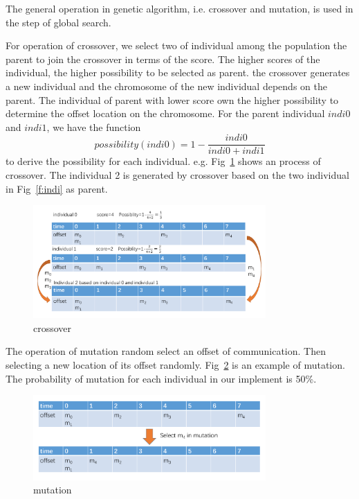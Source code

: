 \documentclass[conference]{IEEEtran}
\begin{document}
The general operation in genetic algorithm, i.e. crossover and mutation, is used in the step of global search. 

For operation of crossover, we select two of individual among the population the parent to join the crossover in terms of the score. The higher scores of the individual, the higher possibility to be selected as parent. the crossover generates a new individual and the chromosome of the new individual depends on the parent. The individual of parent with lower score own the higher possibility to determine the offset location on the chromosome. For the parent individual $indi0$ and $indi1$, we have the function
\begin{equation}
	possibility(indi0)=1-\frac{indi0}{indi0+indi1}
\end{equation}
to derive the possibility for each individual. e.g. Fig~\ref{f:crossover} shows an process of crossover. The individual 2 is generated by crossover based on the two individual in Fig~\ref{f:indi} as parent.
\begin{figure}[!t]
	\centering
	\includegraphics[width=3.5in]{picture/crossover.pdf}
	\caption{crossover}
	\label{f:crossover}
\end{figure}

The operation of mutation random select an offset of communication. Then selecting a new location of its offset randomly. Fig~\ref{f:mutation} is an example of mutation. The probability of mutation for each individual in our implement is 50\%.
\begin{figure}[!t]
	\centering
	\includegraphics[width=3.5in]{picture/mutation.pdf}
	\caption{mutation}
	\label{f:mutation}
\end{figure}
\end{document}
